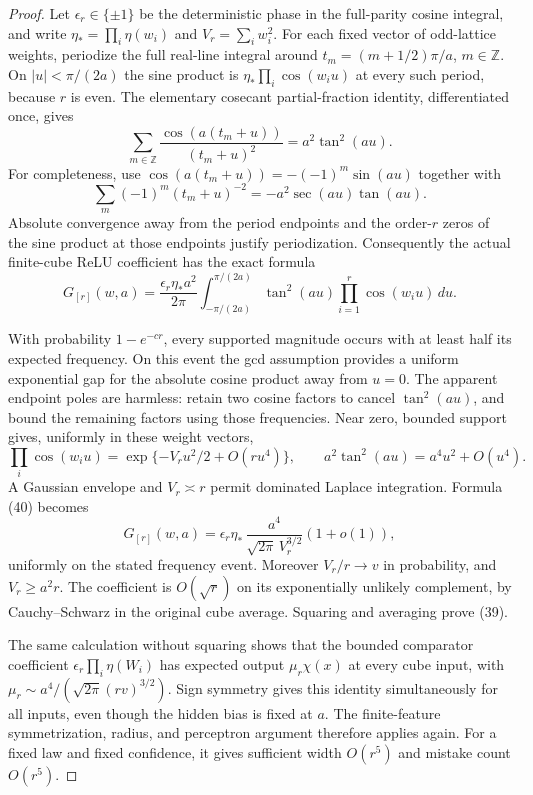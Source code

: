 \begin{proof}
Let $\epsilon_r\in\{\pm1\}$ be the deterministic phase in the
full-parity cosine integral, and write
$\eta_* =\prod_i\eta(w_i)$ and $V_r=\sum_iw_i^2$.
For each fixed vector of odd-lattice weights, periodize the full real-line
integral around $t_m=(m+1/2)\pi/a$, $m\in\mathbb Z$. On
$|u|<\pi/(2a)$ the sine product is
$\eta_*\prod_i\cos(w_i u)$ at every such period, because $r$ is even.
The elementary cosecant partial-fraction identity, differentiated once,
gives
\[
 \sum_{m\in\mathbb Z}\frac{\cos(a(t_m+u))}{(t_m+u)^2}
 =a^2\tan^2(au).
\]
For completeness, use $\cos(a(t_m+u))=-(-1)^m\sin(au)$ together with
\[
 \sum_m(-1)^m(t_m+u)^{-2}=-a^2\sec(au)\tan(au).
\]
Absolute convergence away from the period endpoints and the order-$r$
zeros of the sine product at those endpoints justify periodization.
Consequently the actual finite-cube ReLU coefficient has the exact formula
\[
 G_{[r]}(w,a)=\frac{\epsilon_r\eta_*a^2}{2\pi}
   \int_{-\pi/(2a)}^{\pi/(2a)}
          \tan^2(au)\prod_{i=1}^r\cos(w_i u)\,du.
 \tag{40}
\]

With probability $1-e^{-cr}$, every supported magnitude occurs with
at least half its expected frequency. On this event the gcd assumption
provides a uniform exponential gap for the absolute cosine product away
from $u=0$. The apparent endpoint poles are harmless: retain two cosine
factors to cancel $\tan^2(au)$, and bound the remaining factors using
those frequencies. Near zero, bounded support gives, uniformly in these
weight vectors,
\[
 \prod_i\cos(w_i u)=\exp\{-V_r u^2/2+O(ru^4)\},
 \qquad a^2\tan^2(au)=a^4u^2+O(u^4).
\]
A Gaussian envelope and $V_r\asymp r$ permit dominated Laplace
integration. Formula (40) becomes
\[
 G_{[r]}(w,a)=\epsilon_r\eta_*\,
       \frac{a^4}{\sqrt{2\pi}\,V_r^{3/2}}(1+o(1)),
\]
uniformly on the stated frequency event. Moreover $V_r/r\to v$ in
probability, and $V_r\ge a^2r$. The coefficient is $O(\sqrt r)$
on its exponentially unlikely complement, by Cauchy--Schwarz in the
original cube average. Squaring and averaging prove (39).

The same calculation without squaring shows that the bounded comparator
coefficient $\epsilon_r\prod_i\eta(W_i)$ has expected output
$\mu_r\chi(x)$ at every cube input, with
$\mu_r\sim a^4/(\sqrt{2\pi}(rv)^{3/2})$. Sign symmetry gives this
identity simultaneously for all inputs, even though the hidden bias is
fixed at $a$. The finite-feature symmetrization, radius, and perceptron
argument therefore applies again. For a fixed law and fixed confidence,
it gives sufficient width $O(r^5)$ and mistake count $O(r^5)$.
\end{proof}
